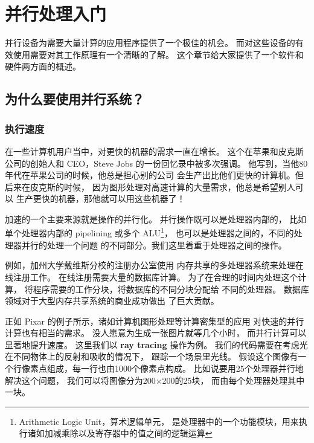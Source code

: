 \chapter{并行处理入门}
\label{chap:intro}

并行设备为需要大量计算的应用程序提供了一个极佳的机会。
而对这些设备的有效使用需要对其工作原理有一个清晰的了解。
这个章节给大家提供了一个软件和硬件两方面的概述。

\section{为什么要使用并行系统？}

\subsection{执行速度}

在一些计算机用户当中，对更快的机器的需求一直在增长。
这个在苹果和皮克斯公司的创始人和 CEO，Steve Jobs 的一份回忆录中被多次强调。
他写到，当他80年代在苹果公司的时候，他总是担心别的公司
会生产出比他们更快的计算机。但后来在皮克斯的时候，
因为图形处理对高速计算的大量需求，他总是希望别人可以
生产更快的机器，那他就可以用这些机器了！

加速的一个主要来源就是操作的并行化。
并行操作既可以是处理器内部的，
比如单个处理器内部的 pipelining 或多个 ALU\footnote{Arithmetic Logic Unit，算术逻辑单元，
是处理器中的一个功能模块，用来执行诸如加减乘除以及寄存器中的值之间的逻辑运算}，
也可以是处理器之间的，不同的处理器并行的处理一个问题
的不同部分。我们这里着重于处理器之间的操作。

例如，加州大学戴维斯分校的注册办公室使用
内存共享的多处理器系统来处理在线注册工作。
在线注册需要大量的数据库计算。
为了在合理的时间内处理这个计算，
将程序需要的工作分块，将数据库的不同分块分配给
不同的处理器。
数据库领域对于大型内存共享系统的商业成功做出
了巨大贡献。

正如 Pixar 的例子所示，诸如计算机图形处理等计算密集型的应用
对快速的并行计算也有相当的需求。
没人愿意为生成一张图片就等几个小时，
而并行计算可以显著地提升速度。
这里我们以 \textbf{ray tracing} 操作为例。
我们的代码需要在考虑光在不同物体上的反射和吸收的情况下，
跟踪一个场景里光线。
假设这个图像有一个行像素点组成，每一行也由1000个像素点构成。
比如说要用25个处理器并行地解决这个问题，
我们可以将图像分为200$\times$200的25块，
而由每个处理器处理其中一块。

